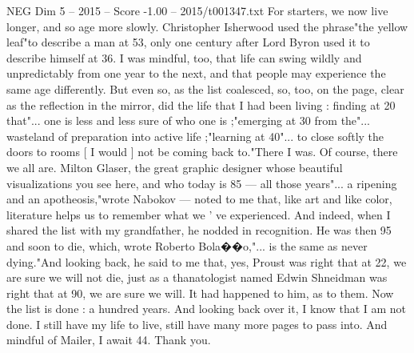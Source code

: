 \begin{textsample}{NEG Dim 5 – 2015 – Score -1.00 – 2015/t001347.txt}
For starters, we now live longer, and so age more slowly.
Christopher Isherwood used the phrase"the yellow leaf"to describe a man at 53, only one century after Lord Byron used it to describe himself at 36.
I was mindful, too, that life can swing wildly and unpredictably from one year to the next, and that people may experience the same age differently.
But even so, as the list coalesced, so, too, on the page, clear as the reflection in the mirror, did the life that I had been living : finding at 20 that"... one is less and less sure of who one is ;"emerging at 30 from the"... wasteland of preparation into active life ;"learning at 40"... to close softly the doors to rooms [ I would ] not be coming back to."There I was.
Of course, there we all are.
Milton Glaser, the great graphic designer whose beautiful visualizations you see here, and who today is 85 — all those years"... a ripening and an apotheosis,"wrote Nabokov — noted to me that, like art and like color, literature helps us to remember what we ' ve experienced.
And indeed, when I shared the list with my grandfather, he nodded in recognition.
He was then 95 and soon to die, which, wrote Roberto Bola{\EmojiFont �}{\EmojiFont �}o,"... is the same as never dying."And looking back, he said to me that, yes, Proust was right that at 22, we are sure we will not die, just as a thanatologist named Edwin Shneidman was right that at 90, we are sure we will.
It had happened to him, as to them.
Now the list is done : a hundred years.
And looking back over it, I know that I am not done.
I still have my life to live, still have many more pages to pass into.
And mindful of Mailer, I await 44.
Thank you.

\end{textsample}
